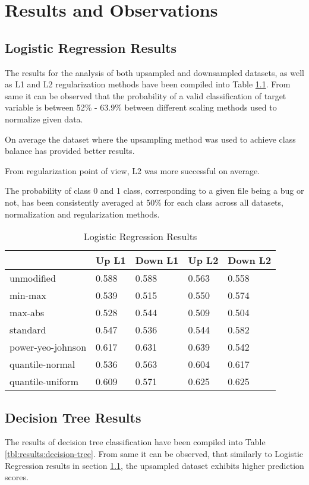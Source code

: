 \chapter{Results and Observations}\label{chp:results-and-observations}
\section{Logistic Regression Results}\label{sec:results:log-reg}
The results for the analysis of both upsampled and downsampled datasets, as well as L1 and L2 regularization methods have been compiled into Table \ref{tbl:results:log-reg}. From same it can be observed that the probability of a valid classification of \isBug{} target variable is between 52\% - 63.9\% between different scaling methods used to normalize given data.

On average the dataset where the upsampling method was used to achieve class balance has provided better results. 

From regularization point of view, L2 was more successful on average.

The probability of class 0 and 1 class, corresponding to a given file being a bug or not, has been consistently averaged at 50\% for each class across all datasets, normalization and regularization methods. 
\begin{table}[h!]
\centering
\caption{Logistic Regression Results}
\label{tbl:results:log-reg}
\begin{tabular}{@{}lllll@{}}
\toprule
 & Up L1 & Down L1 & Up L2 & Down L2 \\ \midrule
unmodified & 0.588 & 0.588 & 0.563 & 0.558 \\
min-max & 0.539 & 0.515 & 0.550 & 0.574 \\
max-abs & 0.528 & 0.544 & 0.509 & 0.504 \\
standard & 0.547 & 0.536 & 0.544 & 0.582 \\
power-yeo-johnson & 0.617 & 0.631 & 0.639 & 0.542 \\
quantile-normal & 0.536 & 0.563 & 0.604 & 0.617 \\
quantile-uniform & 0.609 & 0.571 & 0.625 & 0.625 \\ \bottomrule
\end{tabular}
\end{table}

\section{Decision Tree Results}\label{sec:results:decision-tree}
The results of decision tree classification have been compiled into Table \ref{tbl:results:decision-tree}. From same it can be observed, that similarly to Logistic Regression results in section \ref{sec:results:log-reg}, the upsampled dataset exhibits higher prediction scores. 

